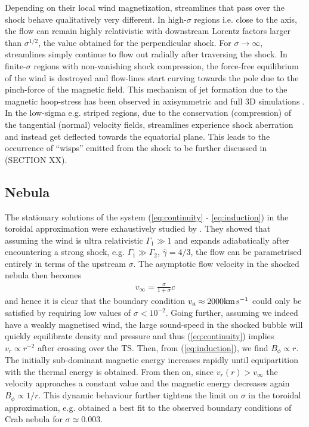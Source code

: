 Depending on their local wind magnetization, streamlines that pass over the shock behave qualitatively very different.  
In high-$\sigma$ regions i.e. close to the axis, the flow can remain highly relativistic with downstream Lorentz factors larger than $\sigma^{1/2}$, the value obtained for the perpendicular shock.  For $\sigma\to\infty$, streamlines simply continue to flow out radially after traversing the shock.  In finite-$\sigma$ regions with non-vanishing shock compression, the force-free equilibrium of the wind is destroyed and flow-lines start curving towards the pole due to the pinch-force of the magnetic field.  This mechanism of jet formation due to the magnetic hoop-stress has been observed in axisymmetric \citep[e.g.][]{komissarov2003a} and full 3D simulations \citep[e.g.][]{PorthKomissarov2014a}.  
In the low-sigma e.g. striped regions, due to the conservation (compression) of the tangential (normal) velocity fields, streamlines experience shock aberration and instead get  deflected towards the equatorial plane.  This leads to the occurrence of ``wisps'' emitted from the shock to be further discussed in (SECTION XX).  


\subsection{Nebula}
\label{sec:nebula}
The stationary solutions of the system (\ref{eq:continuity} - \ref{eq:induction}) in the toroidal approximation were exhaustively studied by \cite{1984ApJ...283..694K}.  They showed that assuming the wind is ultra relativistic $\Gamma_1\gg1$ and expands adiabatically after encountering a strong shock, e.g. $\Gamma_1\gg\Gamma_2$, $\hat{\gamma}=4/3$, the flow can be parametrised entirely in terms of the upstream $\sigma$.  
The asymptotic flow velocity in the shocked nebula then becomes
\begin{align}
v_{\infty} = \frac{\sigma}{1+\sigma} c
\end{align}
and hence it is clear that the boundary condition $v_{\rm n}\approx 2000 \rm km\, s^{-1}$ could only be satisfied by requiring low values of $\sigma<10^{-2}$.  
Going further, assuming we indeed have a weakly magnetised wind, the large sound-speed in the shocked bubble will quickly equilibrate density and pressure and thus (\ref{eq:continuity}) implies $v_r\propto r^{-2}$ after crossing over the TS.  Then, from (\ref{eq:induction}), we find $B_\phi\propto r$.  The initially sub-dominant magnetic energy increases rapidly until equipartition with the thermal energy is obtained.  From then on, since $v_r(r)>v_{\infty}$ the velocity approaches a constant value and the magnetic energy decreases again $B_\phi\propto 1/r$.  
This dynamic behaviour further tightens the limit on $\sigma$ in the toroidal approximation, e.g. \cite{1984ApJ...283..694K} obtained a best fit to the observed boundary conditions of Crab nebula for $\sigma\simeq 0.003$.  

